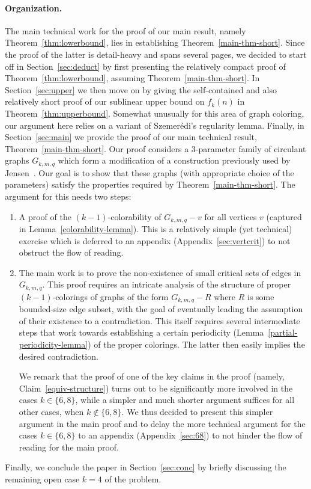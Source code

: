 \documentclass[a4paper,10pt,hidelinks]{amsart}
\theoremstyle{definition}
\begin{document}
\paragraph*{\textbf{Organization.}} The main technical work for the proof of our main result, namely Theorem~\ref{thm:lowerbound}, lies in establishing Theorem~\ref{main-thm-short}. Since the proof of the latter is detail-heavy and spans several pages, we decided to start off in Section~\ref{sec:deduct} by first presenting the relatively compact proof of Theorem~\ref{thm:lowerbound}, assuming Theorem~\ref{main-thm-short}. In Section~\ref{sec:upper} we then move on by giving the self-contained and also relatively short proof of our sublinear upper bound on $f_k(n)$ in Theorem~\ref{thm:upperbound}. Somewhat unusually for this area of graph coloring, our argument here relies on a variant of Szemer\'{e}di's regularity lemma. Finally, in Section~\ref{sec:main} we provide the proof of our main technical result, Theorem~\ref{main-thm-short}. Our proof considers a $3$-parameter family of circulant graphs $G_{k,m,q}$ which form a modification of a construction previously used by Jensen~\cite{jensen}. Our goal is to show that these graphs (with appropriate choice of the parameters) satisfy the properties required by Theorem~\ref{main-thm-short}. The argument for this needs two steps: \begin{enumerate} \item[(1)] A proof of the $(k-1)$-colorability of $G_{k,m,q}-v$ for all vertices $v$ (captured in Lemma~\ref{colorability-lemma}). This is a relatively simple (yet technical) exercise which is deferred to an appendix (Appendix~\ref{sec:vertcrit}) to not obstruct the flow of reading. \item[(2)] The main work is to prove the non-existence of small critical sets of edges in $G_{k,m,q}$. This proof requires an intricate analysis of the structure of proper $(k-1)$-colorings of graphs of the form $G_{k,m,q}-R$ where $R$ is some bounded-size edge subset, with the goal of eventually leading the assumption of their existence to a contradiction. This itself requires several intermediate steps that work towards establishing a certain periodicity (Lemma~\ref{partial-periodicity-lemma}) of the proper colorings. The latter then easily implies the desired contradiction. 

We remark that the proof of one of the key claims in the proof (namely, Claim~\ref{equiv-structure}) turns out to be significantly more involved in the cases $k\in \{6,8\}$, while a simpler and much shorter argument suffices for all other cases, when $k\notin\{6,8\}$. We thus decided to present this simpler argument in the main proof and to delay the more technical argument for the cases $k\in \{6,8\}$ to an appendix (Appendix~\ref{sec:68}) to not hinder the flow of reading for the main proof.
\end{enumerate}
Finally, we conclude the paper in Section~\ref{sec:conc} by briefly discussing the remaining open case $k=4$ of the problem.
\end{document}
